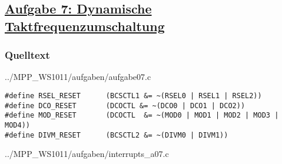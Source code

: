\subsection*
{\href{http://cst.mi.fu-berlin.de/intern/19606-P-MPP/Aufgaben/040203.html}
{Aufgabe 7: Dynamische Taktfrequenzumschaltung}}

\subsubsection*{Quelltext}


{../MPP_WS1011/aufgaben/aufgabe07.c}

\begin{lstlisting}[caption=Macros]
#define RSEL_RESET      (BCSCTL1 &= ~(RSEL0 | RSEL1 | RSEL2))
#define DCO_RESET       (DCOCTL &= ~(DCO0 | DCO1 | DCO2))
#define MOD_RESET       (DCOCTL  &= ~(MOD0 | MOD1 | MOD2 | MOD3 | MOD4))
#define DIVM_RESET      (BCSCTL2 &= ~(DIVM0 | DIVM1))
\end{lstlisting}


{../MPP_WS1011/aufgaben/interrupts_a07.c}

